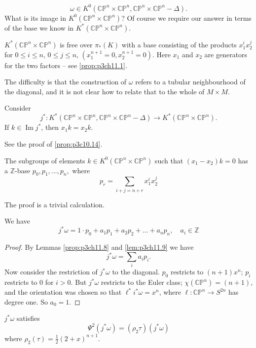 \documentclass[../main]{subfiles}
\begin{document}
\[\omega \in K^0(\mathbb{CP}^n\times\mathbb{CP}^n, \mathbb{CP}^n\times\mathbb{CP}^n -\Delta).\]
What is its image in $K^0(\mathbb{CP}^n\times\mathbb{CP}^n)$? Of course we require our answer in terms of the base we know in $K^\ast (\mathbb{CP}^n\times\mathbb{CP}^n)$.
\begin{proposition} \label{prop:p3ch11.7}
$K^\ast (\mathbb{CP}^n\times\mathbb{CP}^n)$ is free over $\pi_\ast (K)$ with a base consisting of the products $x_1^ix_2^j$ for $0\leq i \leq n$, $0\leq j\leq n$, $(x_1^{n+1}=0, x_2^{n+1}=0)$. Here $x_1$ and $x_2$ are generators for the two factors -- see \ref{prop:p3ch11.1}.
\end{proposition}
\par The difficulty is that the construction of $\omega$ refers to a tubular neighbourhood of the diagonal, and it is not clear how to relate that to the whole of $M\times M$. 
\begin{lemma} \label{prop:p3ch11.8}
Consider \[j^\ast :K^\ast (\mathbb{CP}^n \times \mathbb{CP}^n, \mathbb{CP}^n\times \mathbb{CP}^n - \Delta) \longrightarrow K^\ast (\mathbb{CP}^n\times \mathbb{CP}^n).\]
If $k\in\operatorname{Im}j^\ast $, then $x_1 k = x_2 k$.
\end{lemma}
See the proof of \ref{prop:p3c10.14}.
\begin{lemma} \label{lem:p3ch11.9}
The subgroups of elements $k\in K^0(\mathbb{CP}^n\times \mathbb{CP}^n)$ such that $(x_1-x_2)k=0$ has a $\mathbb{Z}$-base $p_0,p_1,...,p_n,$ where
\[p_r=\sum_{i+j=n+r}x_1^ix_2^j\]
\end{lemma}
\par The proof is a trivial calculation.
\begin{lemma}\label{lem:p3ch11.10}
We have \[j^\ast \omega=1\cdot p_0+a_1p_1+a_2p_2+...+a_np_n, \quad a_i\in \mathbb{Z}\]
\end{lemma}
\begin{proof}
By Lemmas \ref{prop:p3ch11.8} and \ref{lem:p3ch11.9} we have 
\[j^\ast \omega=\sum_ia_ip_i.\]
Now consider the restriction of $j^\ast \omega$ to the diagonal. $p_0$ restricts to $(n+1)x^n$; $p_i$ restricts to $0$ for $i>0$. But $j^\ast \omega$ restricts to the Euler class; $\chi(\mathbb{CP}^n)=(n+1)$, and the orientation was chosen so that $\ell^\ast i^\ast \omega = x^n$, where $\ell:\mathbb{CP}^n\to S^{2n}$ has degree one. So $a_0=1$.
\end{proof}
\begin{lemma}\label{lem:p3ch11.11}
$j^\ast \omega$ satisfies
\[\Psi^2(j^\ast \omega)=(\rho_2\tau)(j^\ast \omega)\]
where $\rho_2(\tau)=\frac{1}{2}(2+x)^{n+1}$.
\end{lemma}
\end{document}

